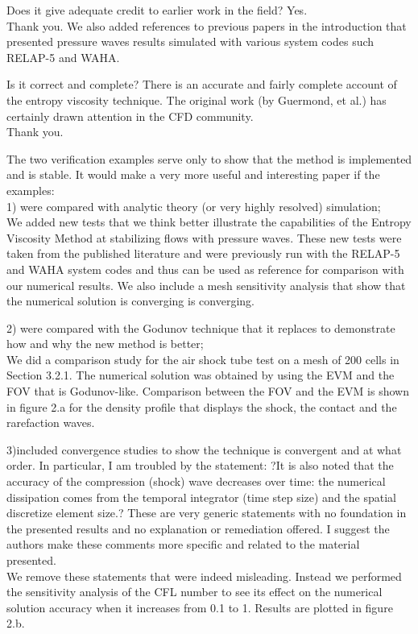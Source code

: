 \documentclass{article}
\begin{document}
\bigskip

{\color{blue}
Does it give adequate credit to earlier work in the field? Yes. \\
}
Thank you. We also added references to previous papers in the introduction that presented pressure waves results simulated with various system codes such RELAP-5 and WAHA.
\bigskip

{\color{blue}
Is it correct and complete?
There is an accurate and fairly complete account of the entropy viscosity technique. The original work (by Guermond, et al.) has certainly drawn attention in the CFD community.\\
}
Thank you.

\bigskip

{\color{blue}
The two verification examples serve only to show that the method is implemented and is stable. It would make a very more useful and interesting paper if the examples: \\
1) were compared with analytic theory (or very highly resolved) simulation; \\
}
We added new tests that we think better illustrate the capabilities of the Entropy Viscosity Method at stabilizing flows with pressure waves. These new tests were taken from the published literature and were previously run with the RELAP-5 and WAHA system codes and thus can be used as reference for comparison with our numerical results. We also include a mesh sensitivity analysis that show that the numerical solution is converging is converging. 
\bigskip

{\color{blue}
2) were compared with the Godunov technique that it replaces to demonstrate how and why the new method is better; \\
}
We did a comparison study for the air shock tube test on a mesh of 200 cells in Section 3.2.1. The numerical solution was obtained by using the EVM and the FOV that is Godunov-like. Comparison between the FOV and the EVM is shown in figure 2.a for the density profile that displays the shock, the contact and the rarefaction waves.
\bigskip

{\color{blue}
3)included convergence studies to show the technique is convergent and at what order.
In particular, I am troubled by the statement: ?It is also noted that the accuracy of the compression (shock) wave decreases over time: the numerical dissipation comes from the temporal integrator (time step size) and the spatial discretize element size.? These are very generic statements with no foundation in the presented results and no explanation or remediation offered. I suggest the authors make these comments more specific and related to the material presented.
\\}
We remove these statements that were indeed misleading. Instead we performed the sensitivity analysis of the CFL number to see its effect on the numerical solution accuracy when it increases from 0.1 to 1. Results are plotted in figure 2.b. 
\bigskip
\end{document}
